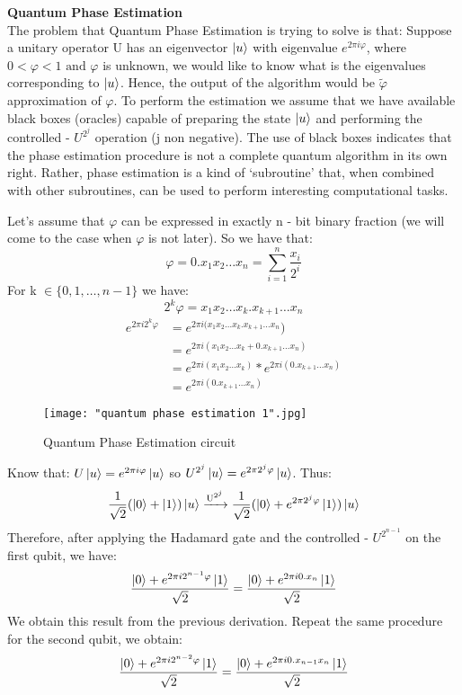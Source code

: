 \documentclass[12pt]{article}
\begin{document}
\textbf{\large Quantum Phase Estimation} \\

The problem that Quantum Phase Estimation is trying to solve is that: Suppose a unitary operator U has an eigenvector $\ket{u}$ with eigenvalue $e^{2 \pi i \varphi}$, where $0 < \varphi < 1 \text{ and } \varphi$ is unknown, we would like to know what is the eigenvalues corresponding to $\ket{u}$. Hence, the output of the algorithm would be  $\widetilde{\varphi}$ approximation of $\varphi$. To perform the estimation we assume that we have available black boxes (oracles) capable of preparing the state $\ket{u}$ and performing the controlled - $U^{2^{j}}$ operation (j non negative). The use of black boxes indicates that the phase estimation procedure is not a complete quantum algorithm in its own right. Rather, phase estimation is a kind of `subroutine' that, when combined with other subroutines, can be used to perform interesting computational tasks. 

Let's assume that $\varphi$ can be expressed in exactly n - bit binary fraction (we will come to the case when $\varphi$ is not later). So we have that:
$$
\varphi = 0.x_{1}x_{2} \dots x_{n} = \sum_{i=1}^{n} \frac{x_{i}}{2^{i}}
$$
For k $\in \{0, 1, \dots, n-1\}$ we have:
$$
2^{k} \varphi = x_{1}x_{2} \dots x_{k}.x_{k+1} \dots x_{n}
$$
\begin{equation}
\begin{split}
e^{2 \pi i 2^{k} \varphi} &= e^{2 \pi i (x_{1}x_{2} \dots x_{k}.x_{k+1} \dots x_{n}}) \\
&= e^{2 \pi i (x_{1}x_{2} \dots x_{k} + 0.x_{k+1} \dots x_{n})} \\
&= e^{2 \pi i (x_{1}x_{2} \dots x_{k})} *  e^{2 \pi i (0.x_{k+1} \dots x_{n})} \\
&= e^{2 \pi i (0.x_{k+1} \dots x_{n})}
\end{split}
\end{equation}

\begin{figure}[h]
    \centering
    \texttt{[image: "quantum phase estimation 1".jpg]}
    \caption{Quantum Phase Estimation circuit}
    \label{fig: Quantum Phase Estimation circuit}
\end{figure}

Know that: $U\ket{u} = e^{2 \pi i \varphi} \ket{u}$ so $U^{2^{j}} \ket{u} = e^{2 \pi 2^{j} \varphi} \ket{u}$. Thus:
$$
\frac{1}{\sqrt{2}}(\ket{0} + \ket{1})\ket{u} \xrightarrow[\text{}]{\text{U}^{2^{j}}} \frac{1}{\sqrt{2}}(\ket{0} +  e^{2 \pi 2^{j} \varphi} \ket{1}) \ket{u}
$$
Therefore, after applying the Hadamard gate and the controlled - $U^{2^{n-1}}$ on the first qubit, we have:
$$
\frac{\ket{0} + e^{2 \pi i 2^{n-1} \varphi} \ket{1}}{\sqrt{2}} = \frac{\ket{0} + e^{2 \pi i 0.x_{n}} \ket{1}}{\sqrt{2}}
$$
We obtain this result from the previous derivation. Repeat the same procedure for the second qubit, we obtain: 
$$
\frac{\ket{0} + e^{2 \pi i 2^{n-2} \varphi} \ket{1}}{\sqrt{2}} = \frac{\ket{0} + e^{2 \pi i 0.x_{n-1}x_{n}} \ket{1}}{\sqrt{2}}
$$
\end{document}

